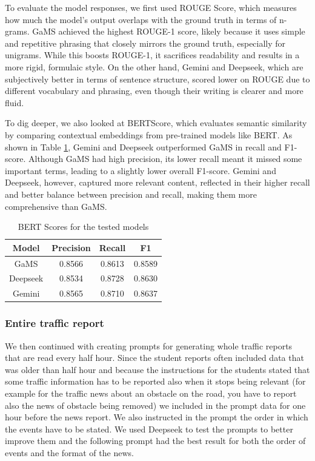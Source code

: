 \documentclass[fleqn,moreauthors,10pt]{ds_report}
\begin{document}
To evaluate the model responses, we first used ROUGE Score, which measures how much the model's output overlaps with the ground truth in terms of n-grams. GaMS achieved the highest ROUGE-1 score, likely because it uses simple and repetitive phrasing that closely mirrors the ground truth, especially for unigrams. While this boosts ROUGE-1, it sacrifices readability and results in a more rigid, formulaic style. On the other hand, Gemini and Deepseek, which are subjectively better in terms of sentence structure, scored lower on ROUGE due to different vocabulary and phrasing, even though their writing is clearer and more fluid.

To dig deeper, we also looked at BERTScore, which evaluates semantic similarity by comparing contextual embeddings from pre-trained models like BERT. As shown in Table \ref{bert}, Gemini and Deepseek outperformed GaMS in recall and F1-score. Although GaMS had high precision, its lower recall meant it missed some important terms, leading to a slightly lower overall F1-score. Gemini and Deepseek, however, captured more relevant content, reflected in their higher recall and better balance between precision and recall, making them more comprehensive than GaMS.



\begin{table}[h!]
\centering
\begin{tabular}{|c|c|c|c|}
\hline
\textbf{Model} & \textbf{Precision} & \textbf{Recall} & \textbf{F1} \\ \hline
GaMS & 0.8566 & 0.8613 & 0.8589 \\ \hline
Deepseek & 0.8534 & 0.8728 & 0.8630 \\ \hline
Gemini & 0.8565 & 0.8710 & 0.8637 \\ \hline
\end{tabular}
\caption{BERT Scores for the tested models}
\label{bert}
\end{table}

\subsubsection*{Entire traffic report}
We then continued with creating prompts for generating whole traffic reports that are read every half hour. Since the student reports often included data that was older than half hour and because the instructions for the students stated that some traffic information has to be reported also when it stops being relevant (for example for the traffic news about an obstacle on the road, you have to report also the news of obstacle being removed) we included in the prompt data for one hour before the news report. We also instructed in the prompt the order in which the events have to be stated. We used Deepseek to test the prompts to better improve them and the following prompt had the best result for both the order of events and the format of the news. 
\end{document}

